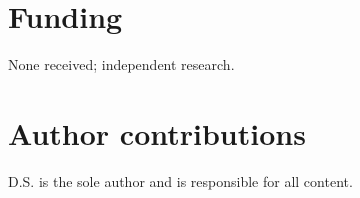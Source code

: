 \documentclass[11pt,twocolumn]{article}
\theoremstyle{gttdef}
\theoremstyle{gttplain}
\begin{document}
\section*{Funding}

None received; independent research.

\section*{Author contributions}

D.S. is the sole author and is responsible for all content.
\nocite{*}


\end{document}
